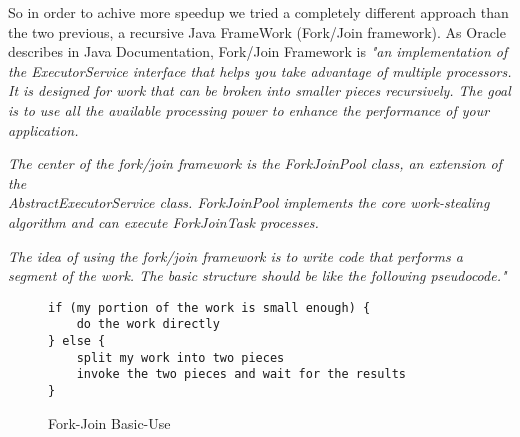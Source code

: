 \documentclass{dithesis}
\begin{document}
        So in order to achive more speedup we tried a completely different approach than the two previous, a recursive Java FrameWork (Fork/Join framework). As Oracle describes in Java Documentation, Fork/Join Framework is
    	\textit{"an implementation of the ExecutorService interface that helps you take advantage of multiple processors. It is designed for work that can be broken into smaller pieces recursively. The goal is to use all the available processing power to enhance the performance of your application.}

		\textit{The center of the fork/join framework is the ForkJoinPool class, an extension of the \\ AbstractExecutorService class. ForkJoinPool implements the core work-stealing algorithm and can execute ForkJoinTask processes.}

    	\textit{The idea of using the fork/join framework is to write code that performs a segment of the work. The basic structure should be like the following pseudocode."} \cite{Oracle Java Fork/Join Framework}

        \begin{figure}[H]
\begin{lstlisting}
if (my portion of the work is small enough) {
    do the work directly
} else {
    split my work into two pieces
    invoke the two pieces and wait for the results
}
\end{lstlisting}
        \caption{Fork-Join Basic-Use}
        \end{figure}
\end{document}
